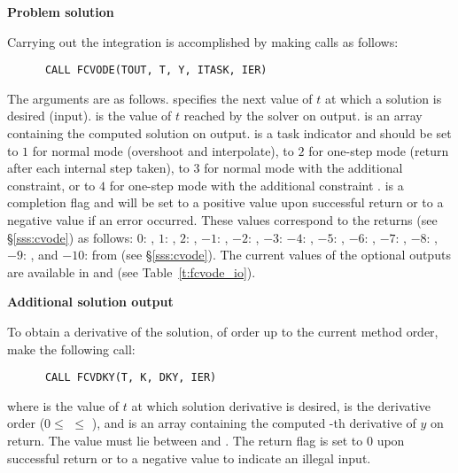 \begin{Steps}
\item {\bf Problem solution}

  Carrying out the integration is accomplished by making calls as follows:
\begin{verbatim}
      CALL FCVODE(TOUT, T, Y, ITASK, IER)
\end{verbatim}
  The arguments are as follows.
   specifies the next value of $t$ at which a solution is desired (input).
   is the value of $t$ reached by the solver on output.
   is an array containing the computed solution on output.
   is a task indicator and should be set to $1$ for normal mode 
  (overshoot  and interpolate), to $2$ for one-step mode 
  (return after each internal step taken), to $3$ for normal mode with
  the additional  constraint, or to $4$ for one-step mode 
  with the additional constraint .
   is a completion flag and will be set to a positive value upon
  successful return or to a negative value if an error occurred. These values
  correspond to the  returns (see \S\ref{sss:cvode}) as follows:
  $0$: , $1$: , $2$: ,
  $-1$: , $-2$: , $-3$: 
  $-4$: , $-5$: , $-6$: ,
  $-7$: , $-8$: , $-9$: , 
  and $-10$:  from  (see \S\ref{sss:cvode}).
  The current values of the optional outputs are available in  and
   (see Table~\ref{t:fcvode_io}).
  
\item {\bf Additional solution output}

  To obtain a derivative of the solution, of order up to the current method
  order, make the following call:
\begin{verbatim}
      CALL FCVDKY(T, K, DKY, IER)
\end{verbatim}
  where
   is the value of $t$ at which solution derivative is desired,
   is the derivative order ($0 \le$  $\le$ ), and
   is an array containing the computed -th derivative of $y$
  on return.  The value  must lie between  and .
  The return flag  is set to $0$ upon successful return or to a negative
  value to indicate an illegal input.
  

\end{Steps}
